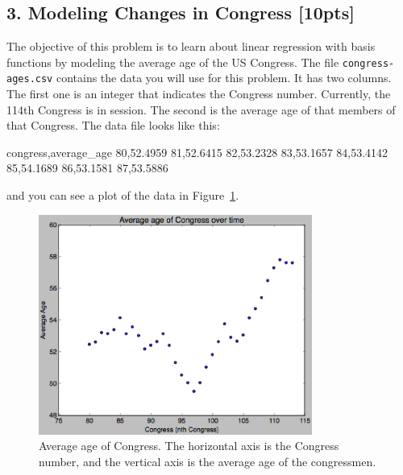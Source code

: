 \documentclass[submit]{harvardml}
\begin{document}
	\subsection*{3. Modeling Changes in Congress [10pts]}
	The objective of this problem is to learn about linear regression with basis
	functions by modeling the average age of the US Congress. The file
	\verb|congress-ages.csv| contains the data you will use for this problem.  It
	has two columns.  The first one is an integer that indicates the Congress
	number. Currently, the 114th Congress is in session. The second is the average
	age of that members of that Congress.  The data file looks like this:
	\begin{csv}
		congress,average_age
		80,52.4959
		81,52.6415
		82,53.2328
		83,53.1657
		84,53.4142
		85,54.1689
		86,53.1581
		87,53.5886
	\end{csv}
	and you can see a plot of the data in Figure~\ref{fig:congress}.
	
	\begin{figure}[h]
		\centering
		\includegraphics[width=0.8\textwidth]{congress-ages.eps}
		\caption{Average age of Congress.  The horizontal axis is the Congress number, and the vertical axis is the average age of the congressmen.}
		\label{fig:congress}
	\end{figure}
	
\end{document}
